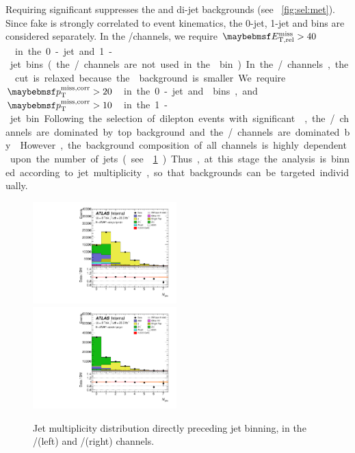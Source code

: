 Requiring significant \met suppresses the \DYll and di-jet backgrounds (see 
\Figure~\ref{fig:sel:met}). Since fake \met is strongly correlated to event kinematics, 
the 0-jet, 1-jet and \twojet bins are considered separately. In the \eech/\mmch channels, 
we require \unit{$\metrel > 40$}{\GeV} in the 0-jet and 1-jet bins (the \eech/\mmch 
channels are not used in the \twojet bin). In the \emch/\mech channels, the \met cut is 
relaxed because the \DYll background is smaller. We require 
\unit{$\corrtrackmet > 20$}{\GeV} in the 0-jet and \twojet bins, and 
\unit{$\corrtrackmet > 10$}{\GeV} in the 1-jet bin.

Following the selection of dilepton events with significant \met, the \emch/\mech 
channels are dominated by top background and the \eech/\mmch channels are dominated by 
\DYll. However, the background composition of all channels is highly dependent upon the 
number of jets (see \Figure~\ref{fig:sel:njets}). Thus, at this stage the analysis is 
binned according to jet multiplicity, so that backgrounds can be targeted individually.

\begin{figure}
	\includegraphics[width=0.495\textwidth]{tex/selection/emme_CutMETRel_m_jet_n_upTo7_mh125_lin}
	\hfill
	\includegraphics[width=0.495\textwidth]{tex/selection/eemm_CutMETRel_m_jet_n_upTo7_mh125_lin}
	\caption{Jet multiplicity distribution directly preceding jet binning, in the 
	\emch/\mech (left) and \eech/\mmch (right) channels.}
	\label{fig:sel:njets}
\end{figure}



